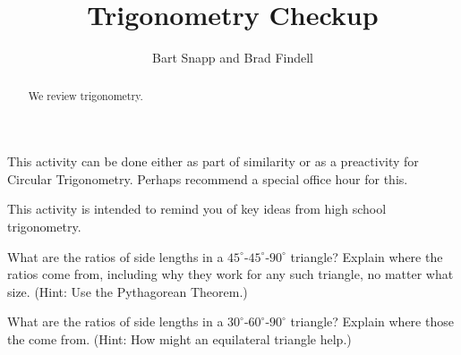 \documentclass[nooutcomes]{ximera}
\title{Trigonometry Checkup}
\author{Bart Snapp and Brad Findell}
\begin{document}
\begin{abstract}
  We review trigonometry.
\end{abstract}
\maketitle

\begin{teachingnote}
This activity can be done either as part of similarity or as a preactivity for Circular Trigonometry.  Perhaps recommend a special office hour for this.  
\end{teachingnote}
This activity is intended to remind you of key ideas from high school trigonometry. 

\begin{problem}
What are the ratios of side lengths in a $45^\circ$-$45^\circ$-$90^\circ$ triangle?  Explain where the ratios come from, including why they work for any such triangle, no matter what size.  (Hint: Use the Pythagorean Theorem.)
\end{problem}

\vspace{0.1in}

\begin{problem}
What are the ratios of side lengths in a $30^\circ$-$60^\circ$-$90^\circ$ triangle?  Explain where those the come from.  (Hint: How might an equilateral triangle help.)
\end{problem}

\vspace{0.1in}
\end{document}
